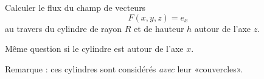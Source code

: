 
\begin{exercice}\label{exoOutilsMath-0110}

    Calculer le flux du champ de vecteurs
    \begin{equation}
        F(x,y,z)=e_x
    \end{equation}
    au travers du cylindre de rayon $R$ et de hauteur $h$ autour de l'axe $z$.

    Même question si le cylindre est autour de l'axe $x$.

Remarque : ces cylindres sont considérés \emph{avec} leur «couvercles».

\end{exercice}
